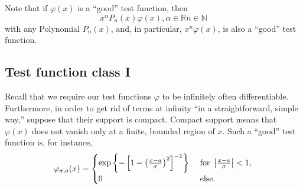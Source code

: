 Note that if $\varphi (x)$ is a ``good'' test function, then
\begin{equation}
x^\alpha P_n (x)\varphi (x), \alpha \in \mathbb{R} n \in \mathbb{N}
\end{equation}
with any Polynomial $P_n (x)$, and, in particular, $x^n\varphi (x)  $, is also
 a ``good'' test function.

\subsection{Test function class I}

Recall that we require \cite{schwartz} our test functions $\varphi$
to be infinitely often differentiable. Furthermore, in order to get rid of terms at infinity ``in a straightforward, simple way,''
suppose that their support is compact.
Compact support means that $\varphi (x)$ does not vanish only at a finite, bounded region of $x$.
Such a ``good'' test function is, for instance,
\begin{equation}
\varphi_{\sigma ,a}(x)
=
\begin{cases}
\exp \left\{ -\left[ 1 - \left( \frac{x-a}{\sigma }\right)^2 \right]^{-1} \right\} & \textrm{ for } \left\vert  {x-a\over \sigma }\right\vert <1, \\
                                0 & \textrm{ else.}
\end{cases}
\label{2018-m-ch-di-tf1}
\end{equation}

